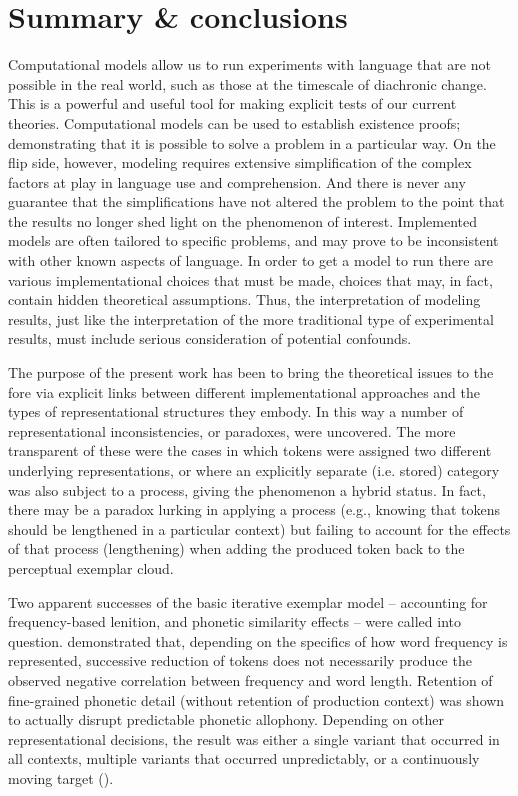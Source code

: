 \section{Summary \& conclusions}

Computational models allow us to run experiments with language that
are not possible in the real world, such as those at the timescale
of diachronic change. This is a powerful and useful tool for making
explicit tests of our current theories. Computational models can be
used to establish existence proofs; demonstrating that it is possible
to solve a problem in a particular way. On the flip side, however,
modeling requires extensive simplification of the complex factors
at play in language use and comprehension. And there is never any
guarantee that the simplifications have not altered the problem to
the point that the results no longer shed light on the phenomenon
of interest. Implemented models are often tailored to specific problems,
and may prove to be inconsistent with other known aspects of language.
In order to get a model to run there are various implementational
choices that must be made, choices that may, in fact, contain hidden
theoretical assumptions. Thus, the interpretation of modeling results,
just like the interpretation of the more traditional type of experimental
results, must include serious consideration of potential confounds. 

The purpose of the present work has been to bring the theoretical
issues to the fore via explicit links between different implementational
approaches and the types of representational structures they embody.
In this way a number of representational inconsistencies, or paradoxes,
were uncovered. The more transparent of these were the cases in which
tokens were assigned two different underlying representations, or
where an explicitly separate (i.e. stored) category was also subject
to a process, giving the phenomenon a hybrid 
status. In fact, there may be a paradox lurking in applying a process
(e.g., knowing that tokens should be lengthened in a particular context)
but failing to account for the effects of that process (lengthening)
when adding the produced token back to the perceptual exemplar cloud. 

Two apparent successes of the basic iterative exemplar model – accounting
for frequency-based lenition, and phonetic similarity effects – were
called into question. 
demonstrated that, depending on the specifics of how word frequency
is represented, successive reduction of tokens does not necessarily
produce the observed negative correlation between frequency and word
length. Retention of fine-grained phonetic detail (without retention
of production context) was shown to actually disrupt predictable phonetic
allophony. Depending on other representational decisions, the result
was either a single variant that occurred in all contexts, multiple
variants that occurred unpredictably, or a continuously moving target
(). 

